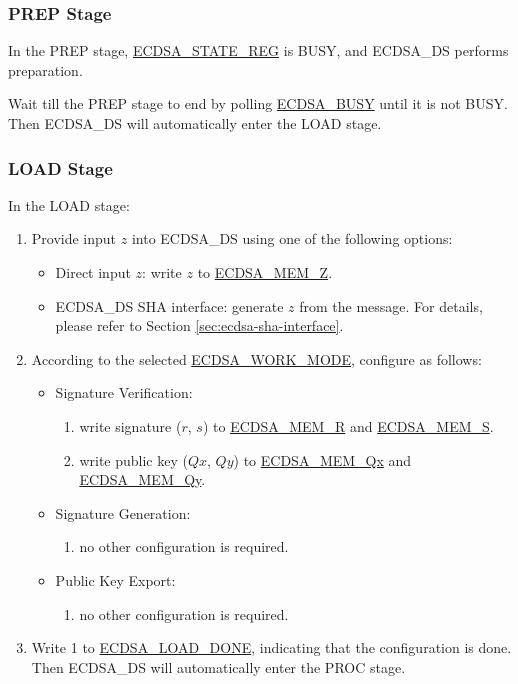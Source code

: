 \documentclass[main\_\_EN.tex]{subfiles}
\begin{document}
\subsubsection{PREP Stage}

In the PREP stage, \hyperref[regdesc:ECDSASTATEREG]{ECDSA\_STATE\_REG} is BUSY, and ECDSA\_DS performs preparation.

Wait till the PREP stage to end by polling \hyperref[fielddesc:ECDSABUSY]{ECDSA\_BUSY} until it is not BUSY. Then ECDSA\_DS will automatically enter the LOAD stage.

\subsubsection{LOAD Stage}
In the LOAD stage:

\begin{enumerate}
	\item Provide input $z$ into ECDSA\_DS using one of the following options:
	      \begin{itemize}
		      \item Direct input $z$: write $z$ to \hyperref[tab:ecdsa-memory]{ECDSA\_MEM\_Z}.
		      \item ECDSA\_DS SHA interface: generate $z$ from the message. For details, please refer to Section \ref{sec:ecdsa-sha-interface}.
	      \end{itemize}
	\item According to the selected \hyperref[fielddesc:ECDSAWORKMODE]{ECDSA\_WORK\_MODE}, configure as follows:
	      \begin{itemize}
		      \item Signature Verification:
		            \begin{enumerate}
			            \item write signature ($r$, $s$) to \hyperref[tab:ecdsa-memory]{ECDSA\_MEM\_R} and \hyperref[tab:ecdsa-memory]{ECDSA\_MEM\_S}.
			            \item write public key ($Qx$, $Qy$) to \hyperref[tab:ecdsa-memory]{ECDSA\_MEM\_Qx} and \hyperref[tab:ecdsa-memory]{ECDSA\_MEM\_Qy}.
		            \end{enumerate}
		      \item Signature Generation:
		            \begin{enumerate}
			            \item no other configuration is required.
		            \end{enumerate}
                \item Public Key Export:
		            \begin{enumerate}
                            \item no other configuration is required.
		            \end{enumerate}
	      \end{itemize}
	\item Write 1 to \hyperref[fielddesc:ECDSALOADDONE]{ECDSA\_LOAD\_DONE}, indicating that the configuration is done. Then ECDSA\_DS will automatically enter the PROC stage.
\end{enumerate}
\end{document}
